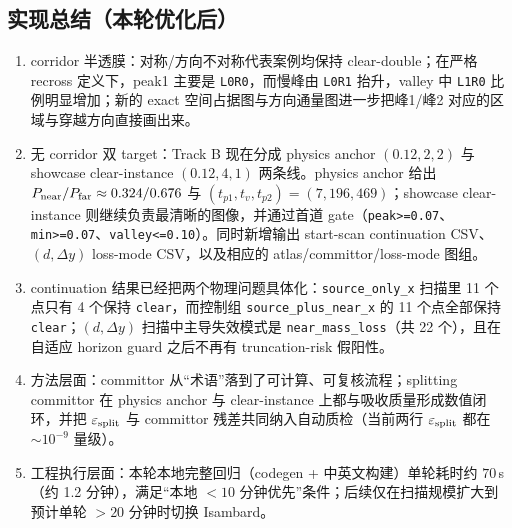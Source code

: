 \documentclass[11pt,fontset=fandol]{ctexart}
\begin{document}
\subsection*{实现总结（本轮优化后）}
\begin{enumerate}
  \item corridor 半透膜：对称/方向不对称代表案例均保持 clear-double；在严格 recross 定义下，peak1 主要是 \texttt{L0R0}，而慢峰由 \texttt{L0R1} 抬升，valley 中 \texttt{L1R0} 比例明显增加；新的 exact 空间占据图与方向通量图进一步把峰1/峰2 对应的区域与穿越方向直接画出来。
  \item 无 corridor 双 target：Track B 现在分成 physics anchor $(0.12,2,2)$ 与 showcase clear-instance $(0.12,4,1)$ 两条线。physics anchor 给出 $P_{\rm near}/P_{\rm far}\approx0.324/0.676$ 与 $(t_{p1},t_v,t_{p2})=(7,196,469)$；showcase clear-instance 则继续负责最清晰的图像，并通过首道 gate（\texttt{peak>=0.07}、\texttt{min>=0.07}、\texttt{valley<=0.10}）。同时新增输出 start-scan continuation CSV、$(d,\Delta y)$ loss-mode CSV，以及相应的 atlas/committor/loss-mode 图组。
  \item continuation 结果已经把两个物理问题具体化：\texttt{source\_only\_x} 扫描里 11 个点只有 4 个保持 \texttt{clear}，而控制组 \texttt{source\_plus\_near\_x} 的 11 个点全部保持 \texttt{clear}；$(d,\Delta y)$ 扫描中主导失效模式是 \texttt{near\_mass\_loss}（共 22 个），且在自适应 horizon guard 之后不再有 truncation-risk 假阳性。
  \item 方法层面：committor 从“术语”落到了可计算、可复核流程；splitting committor 在 physics anchor 与 clear-instance 上都与吸收质量形成数值闭环，并把 $\varepsilon_{\rm split}$ 与 committor 残差共同纳入自动质检（当前两行 $\varepsilon_{\rm split}$ 都在 $\sim10^{-9}$ 量级）。
  \item 工程执行层面：本轮本地完整回归（codegen + 中英文构建）单轮耗时约 $70\,$s（约 1.2 分钟），满足“本地 $<10$ 分钟优先”条件；后续仅在扫描规模扩大到预计单轮 $>20$ 分钟时切换 Isambard。
\end{enumerate}
\end{document}
